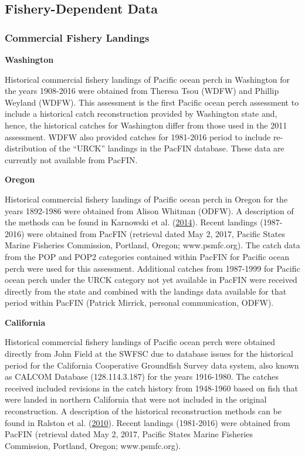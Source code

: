 \documentclass[12pt,]{article}
\begin{document}
\subsection{Fishery-Dependent Data}\label{fishery-dependent-data}

\subsubsection{Commercial Fishery
Landings}\label{commercial-fishery-landings}

\textbf{Washington}

Historical commercial fishery landings of Pacific ocean perch in
Washington for the years 1908-2016 were obtained from Theresa Tsou
(WDFW) and Phillip Weyland (WDFW). This assessment is the first Pacific
ocean perch assessment to include a historical catch reconstruction
provided by Washington state and, hence, the historical catches for
Washington differ from those used in the 2011 assessment. WDFW also
provided catches for 1981-2016 period to include re-distribution of the
``URCK'' landings in the PacFIN database. These data are currently not
available from PacFIN.

\textbf{Oregon}

Historical commercial fishery landings of Pacific ocean perch in Oregon
for the years 1892-1986 were obtained from Alison Whitman (ODFW). A
description of the methods can be found in Karnowski et al.
(\protect\hyperlink{ref-karnowski_historical_2014}{2014}). Recent
landings (1987-2016) were obtained from PacFIN (retrieval dated May 2,
2017, Pacific States Marine Fisheries Commission, Portland, Oregon;
www.psmfc.org). The catch data from the POP and POP2 categories
contained within PacFIN for Pacific ocean perch were used for this
assessment. Additional catches from 1987-1999 for Pacific ocean perch
under the URCK category not yet available in PacFIN were received
directly from the state and combined with the landings data available
for that period within PacFIN (Patrick Mirrick, personal communication,
ODFW).

\textbf{California}

Historical commercial fishery landings of Pacific ocean perch were
obtained directly from John Field at the SWFSC due to database issues
for the historical period for the California Cooperative Groundfish
Survey data system, also known as CALCOM Database (128.114.3.187) for
the years 1916-1980. The catches received included revisions in the
catch history from 1948-1960 based on fish that were landed in northern
California that were not included in the original reconstruction. A
description of the historical reconstruction methods can be found in
Ralston et al.
(\protect\hyperlink{ref-ralston_documentation_2010}{2010}). Recent
landings (1981-2016) were obtained from PacFIN (retrieval dated May 2,
2017, Pacific States Marine Fisheries Commission, Portland, Oregon;
www.psmfc.org).
\end{document}
